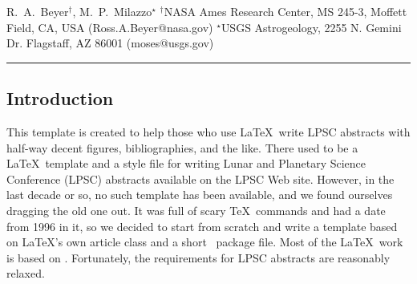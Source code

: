 \documentclass[twoside]{article}
\begin{document}

{R.~A.~Beyer$^{\dag}$, M.~P.~Milazzo$^{\star}$ $^{\dag}$NASA Ames Research Center, MS 245-3, Moffett Field, CA, USA (Ross.A.Beyer@nasa.gov) $^{\star}$USGS Astrogeology, 2255 N. Gemini Dr. Flagstaff, AZ 86001 (moses@usgs.gov) \\ \hrule
} 

%

%


\balance


\subsection*{Introduction} This template is created to help those who use
\LaTeX\ write LPSC abstracts with half-way decent figures, bibliographies, 
and the like. 
There used to be a \LaTeX\ template and a style file for writing
Lunar and Planetary Science Conference (LPSC) abstracts available
on the LPSC Web site.  
However, in the last decade or so, no such template has been available, and we found ourselves dragging the old one out.  
It was full of scary \TeX\ commands and had a date from 1996 in it, so we decided to start from scratch and write a template based on \LaTeX's own article class and a short \LaTeXe\ package file.  
Most of the \LaTeX\ work is based on \citep{kopka2003guide}.
Fortunately, the requirements for LPSC abstracts \citep{LPSC} are reasonably relaxed.
\end{document}
